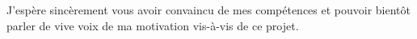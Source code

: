 \documentclass[12pt,stdletter,orderfromtodate,sigleft]{newlfm}
\begin{document}
\begin{newlfm}







J'espère sincèrement vous avoir convaincu de mes compétences et pouvoir bientôt parler de vive voix de ma motivation vis-à-vis de ce projet.





%
%




\end{newlfm}
\end{document}
